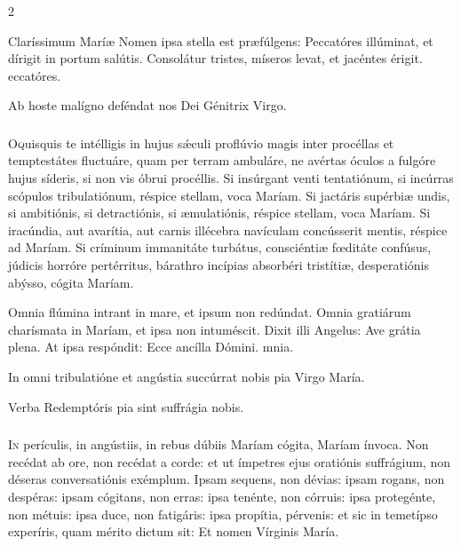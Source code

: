 \documentclass[9pt,twoside]{extarticle}
\begin{document}
\begin{multicols}{2}
\begin{tightlist}{}
\item {} Claríssimum Maríæ Nomen ipsa stella est præfúlgens: \textred{*} Peccatóres illúminat, et dírigit in portum salútis.  Consolátur tristes, míseros levat, et jacéntes érigit. eccatóres.
\item {\small {} Ab hoste malígno deféndat nos Dei Génitrix Virgo.}
\end{tightlist}

\subsubsection*{\center {}}
\lettrine{O} quisquis te intélligis in hujus sǽculi proflúvio magis inter procéllas et temptestátes fluctuáre, quam per terram ambuláre, ne avértas óculos a fulgóre hujus síderis, si non vis óbrui procéllis. Si insúrgant venti tentatiónum, si incúrras scópulos tribulatiónum, réspice stellam, voca Maríam. Si jactáris supérbiæ undis, si ambitiónis, si detractiónis, si æmulatiónis, réspice stellam, voca Maríam. Si iracúndia, aut avarítia, aut carnis illécebra navículam concússerit mentis, réspice ad Maríam. Si críminum immanitáte turbátus, consciéntiæ fœditáte confúsus, júdicis horróre pertérritus, bárathro incípias absorbéri tristítiæ, desperatiónis abýsso, cógita Maríam.

\begin{tightlist}{}
\item {} Omnia flúmina intrant in mare, et ipsum non redúndat. \textred{*} Omnia gratiárum charísmata in Maríam, et ipsa non intuméscit.  Dixit illi Angelus: Ave grátia plena. At ipsa respóndit: Ecce ancílla Dómini. mnia.
\item {\small {} In omni tribulatióne et angústia succúrrat nobis pia Virgo María.}
\item {\small {}}
\item {\small {} Verba Redemptóris pia sint suffrágia nobis.}
\end{tightlist}

\subsubsection*{\center {}}
\lettrine{I}n perículis, in angústiis, in rebus dúbiis Maríam cógita, Maríam ínvoca. Non recédat ab ore, non recédat a corde: et ut ímpetres ejus oratiónis suffrágium, non déseras conversatiónis exémplum. Ipsam sequens, non dévias: ipsam rogans, non despéras: ipsam cógitans, non erras: ipsa tenénte, non córruis: ipsa protegénte, non métuis: ipsa duce, non fatigáris: ipsa propítia, pérvenis: et sic in temetípso experíris, quam mérito dictum sit: Et nomen Vírginis María.


\end{multicols}
\end{document}
